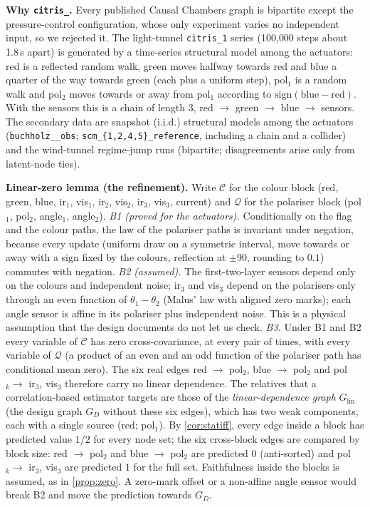 \textbf{Why \texttt{citris\_}.} Every published Causal Chambers graph is bipartite except the pressure-control
configuration, whose only experiment varies no independent input, so we rejected it. The light-tunnel
\texttt{citris\_1} series (100{,}000 steps about 1.8\,s apart) is generated by a time-series structural model among the actuators:
red is a reflected random walk, green moves halfway towards red and blue a quarter of the way towards green (each plus a uniform step),
pol$_1$ is a random walk and pol$_2$ moves towards or away from pol$_1$ according to $\mathrm{sign}(\mathrm{blue}-\mathrm{red})$.
With the sensors this is a chain of length 3, red $\to$ green $\to$ blue $\to$ sensors. The secondary data are
snapshot (i.i.d.) structural models among the actuators
(\texttt{buchholz\_\_\allowbreak obs}; \texttt{scm\_\allowbreak \{1,2,4,5\}\_\allowbreak reference}, including a chain and a collider)
and the wind-tunnel regime-jump runs (bipartite; disagreements arise only from latent-node ties).

\textbf{Linear-zero lemma (the refinement).} Write $\mathcal C$ for the colour block (red, green, blue, ir$_1$,
vis$_1$, ir$_2$, vis$_2$, ir$_3$, vis$_3$, current) and $\mathcal Q$ for the polariser block (pol$_1$, pol$_2$, angle$_1$, angle$_2$).
\emph{B1 (proved for the actuators).} Conditionally on the flag and the colour paths, the law of the polariser
paths is invariant under negation, because every update (uniform draw on a symmetric interval, move towards or
away with a sign fixed by the colours, reflection at $\pm90$, rounding to $0.1$) commutes with negation.
\emph{B2 (assumed).} The first-two-layer sensors depend only on the colours and independent noise; ir$_3$ and vis$_3$
depend on the polarisers only through an even function of $\theta_1-\theta_2$ (Malus' law with aligned zero marks); each angle sensor is affine in its polariser plus
independent noise. This is a physical assumption that the design documents do not let us check.
\emph{B3.} Under B1 and B2 every variable of $\mathcal C$ has zero cross-covariance, at every pair of times, with every variable of
$\mathcal Q$ (a product of an even and an odd function of the polariser path has conditional mean zero). The six real edges
red $\to$ pol$_2$, blue $\to$ pol$_2$ and pol$_k\to$ ir$_3$, vis$_3$ therefore carry no linear dependence. The relatives that a
correlation-based estimator targets are those of the \emph{linear-dependence graph} $G_{\mathrm{lin}}$ (the design graph $G_D$ without these six edges),
which has two weak components, each with a single source (red; pol$_1$). By \cref{cor:statiff}, every edge inside a block has predicted value $1/2$ for every node set; the six cross-block
edges are compared by block size: red $\to$ pol$_2$ and blue $\to$ pol$_2$ are predicted $0$ (anti-sorted) and pol$_k\to$ ir$_3$, vis$_3$ are predicted $1$ for the full set.
Faithfulness inside the blocks is assumed, as in \cref{prop:zero}. A zero-mark offset or a non-affine angle sensor would break B2 and move the prediction towards $G_D$.

